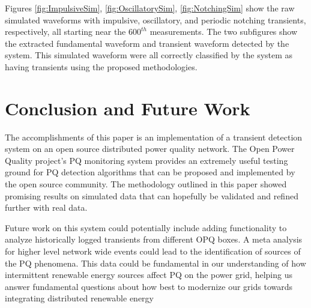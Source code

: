 \documentclass[10pt,conference,compsocconf]{IEEEtran}
\begin{document}
Figures \ref{fig:ImpulsiveSim}, \ref{fig:OscillatorySim}, \ref{fig:NotchingSim} show the raw simulated waveforms with impulsive, oscillatory, and periodic notching transients, respectively, all starting near the $600^{th}$ measurements. The two subfigures show the extracted fundamental waveform and transient waveform detected by the system. This simulated waveform were all correctly classified by the system as having transients using the proposed methodologies. 

\section{Conclusion and Future Work}
\label{sec:Conlcusion}
The accomplishments of this paper is an implementation of a transient detection system on an open source distributed power quality network. The Open Power Quality project's PQ monitoring system provides an extremely useful testing ground for PQ detection algorithms that can be proposed and implemented by the open source community. The methodology outlined in this paper showed promising results on simulated data that can hopefully be validated and refined further with real data. 

Future work on this system could potentially include adding functionality to analyze historically logged transients from different OPQ boxes. A meta analysis for higher level network wide events could lead to the identification of sources of the PQ phenomena. This data could be fundamental in our understanding of how intermittent renewable energy sources affect PQ on the power grid, helping us answer fundamental questions about how best to modernize our grids towards integrating distributed renewable energy





%
%
%
%
%




\end{document}
